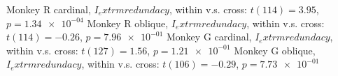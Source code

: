 Monkey R cardinal, $I_	extrm{redundacy}$, within v.s. cross: $t(114) = 3.95$, $p = \num{1.34e-04}$ 
Monkey R oblique, $I_	extrm{redundacy}$, within v.s. cross:  $t(114) = -0.26$, $p = \num{7.96e-01}$ 
Monkey G cardinal, $I_	extrm{redundacy}$, within v.s. cross: $t(127) = 1.56$, $p = \num{1.21e-01}$ 
Monkey G oblique, $I_	extrm{redundacy}$, within v.s. cross:  $t(106) = -0.29$, $p = \num{7.73e-01}$ 

